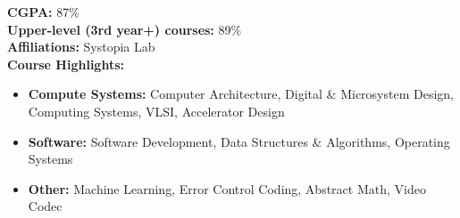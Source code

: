 \documentclass[10pt,a4paper,ragged2e,withhyper]{altacv}
\begin{document}
\begin{paracol}{2}










\textbf{CGPA:} 87\% \\
\textbf{Upper-level (3rd year+) courses:} 89\% \\
\textbf{Affiliations:} Systopia Lab \\

\textbf{Course Highlights:}
\begin{itemize}
  \item \textbf{Compute Systems:} Computer Architecture, Digital \& Microsystem Design, Computing Systems, VLSI, Accelerator Design
  \item \textbf{Software:} Software Development, Data Structures \& Algorithms, Operating Systems
  \item \textbf{Other:} Machine Learning, Error Control Coding, Abstract Math, Video Codec
\end{itemize}






\end{paracol}
\end{document}
